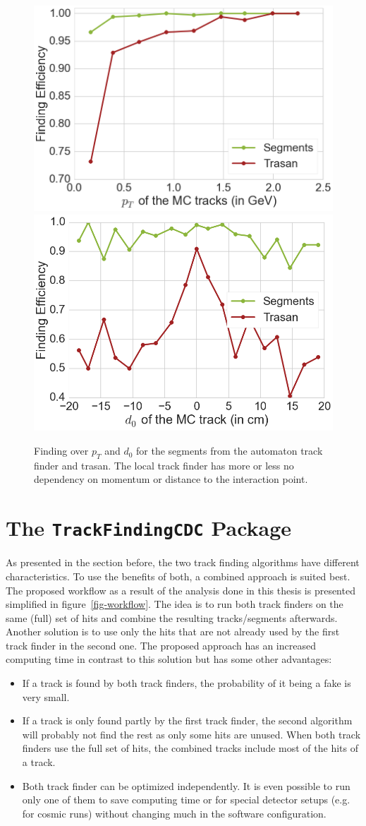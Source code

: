 \begin{figure}
  \centering
  \includegraphics[width=0.48\linewidth]{figures/workflow/segments_pt.png}
  \includegraphics[width=0.48\linewidth]{figures/workflow/segments_d0.png}
  \caption{Finding over $p_T$ and $d_0$ for the segments from the automaton track finder and trasan. The local track finder has more or less no dependency on momentum or distance to the interaction point.}
  \label{fig-segments-efficiency}
\end{figure}

\section{The \texttt{TrackFindingCDC} Package}
As presented in the section before, the two track finding algorithms have different characteristics. To use the benefits of both, a combined approach is suited best. The proposed workflow as a result of the analysis done in this thesis is presented simplified in figure~\ref{fig-workflow}. The idea is to run both track finders on the same (full) set of hits and combine the resulting tracks/segments afterwards. Another solution is to use only the hits that are not already used by the first track finder in the second one. The proposed approach has an increased computing time in contrast to this solution but has some other advantages: 
\begin{itemize}
 \item If a track is found by both track finders, the probability of it being a fake is very small.
 \item If a track is only found partly by the first track finder, the second algorithm will probably not find the rest as only some hits are unused. When both track finders use the full set of hits, the combined tracks include most of the hits of a track.
 \item Both track finder can be optimized independently. It is even possible to run only one of them to save computing time or for special detector setups (e.g. for cosmic runs) without changing much in the software configuration.
\end{itemize}

